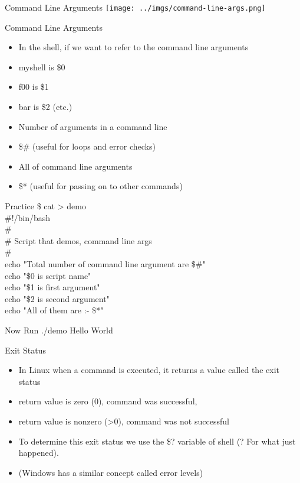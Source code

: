 \documentclass{beamer}
\begin{document}
\begin{frame}{Command Line Arguments}
\texttt{[image: ../imgs/command-line-args.png]}
\end{frame}

\begin{frame}{Command Line Arguments}
\begin{itemize}
\item In the shell, if we want to refer to the command line arguments
\item myshell is \$0
\item f00 is \$1
\item bar is \$2 (etc.)
\item Number of arguments in a command line
\item \$\# (useful for loops and error checks)
\item All of command line arguments
\item \$* (useful for passing on to other commands)
\end{itemize}
\end{frame}

\begin{frame}{Practice}
\$ cat > demo \\
\#!/bin/bash \\
\# \\
\# Script that demos, command line args \\
\# \\
echo "Total number of command line argument are \$\#" \\
echo "\$0 is script name" \\
echo "\$1 is first argument" \\
echo "\$2 is second argument" \\
echo "All of them are :- \$*"

\end{frame}

\begin{frame}{Now Run}
./demo Hello World
\end{frame}

\begin{frame}{Exit Status}
\begin{itemize}
\item In Linux when a command is executed, it returns a value called the exit status
\item return value is zero (0), command was successful,
\item return value is nonzero (>0), command was not successful
\item To determine this exit status we use the \$? variable of shell (? For what just happened).
\item (Windows has a similar concept called error levels)
\end{itemize}
\end{frame}
\end{document}
